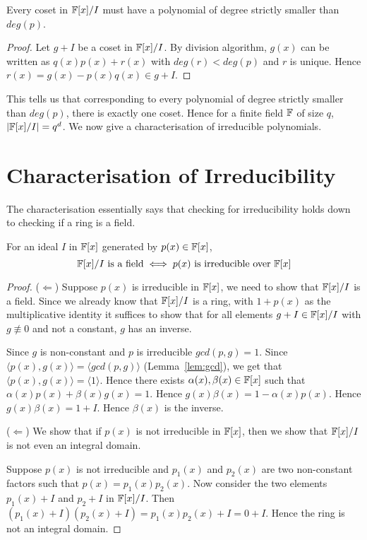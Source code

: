 \begin{observation}
	Every coset in ${\mathbb{F}}[x]/I$ must have a polynomial of degree strictly
	smaller than $deg(p)$.
\end{observation}
\begin{proof}
	Let $g + I$ be a coset in ${\mathbb{F}}[x]/I$. By division algorithm, $g(x)$ can
	be written as $q(x)p(x) + r(x)$ with $deg(r) < deg(p)$ and $r$ is
	unique. Hence $r(x) = g(x) - p(x)q(x) \in g +I$.
\end{proof}

This tells us that corresponding to every polynomial of degree strictly
smaller than $deg(p)$, there is exactly one coset. Hence for a finite field
${\mathbb{F}}$ of size $q$, $|{\mathbb{F}}[x]/I| = q^d$.  We now give a characterisation of
irreducible polynomials.  
\section{Characterisation of Irreducibility}
The characterisation essentially says that checking for irreducibility holds
down to checking if a ring is a field.
\begin{theorem}
	For an ideal $I$ in ${\mathbb{F}}[x]$ generated by $p(x) \in {\mathbb{F}}[x]$, 
	\[ {\mathbb{F}}[x]/I \text{ is a field} \iff p(x) \text{ is irreducible over }
	{\mathbb{F}}[x] \]
\end{theorem}
\begin{proof}
	($\Longleftarrow$) Suppose $p(x)$ is irreducible in ${\mathbb{F}}[x]$, we need
	to show that ${\mathbb{F}}[x]/I$ is a field. Since we already know that
	${\mathbb{F}}[x]/I$ is a ring, with $1+p(x)$ as the multiplicative identity it
	suffices to show that for all elements $g + I \in {\mathbb{F}}[x]/I$ with $g
	\not \equiv 0$ and not a constant, $g$ has an inverse. 

	Since $g$ is non-constant and $p$ is irreducible $gcd(p,g) = 1$. Since
	$\langle p(x), g(x) \rangle = \langle gcd(p,g) \rangle$
	(Lemma~\ref{lem:gcd}), we get that $\langle p(x) ,g(x) \rangle =
	\langle 1 \rangle$. Hence there exists $\alpha(x), \beta(x) \in {\mathbb{F}}[x]$
	such that $\alpha(x)p(x) + \beta(x)g(x) = 1$. Hence $g(x)\beta(x) = 1
	- \alpha(x)p(x)$. Hence $g(x) \beta(x) = 1 + I$. Hence $\beta(x)$ is
	the inverse.

	($\Longleftarrow$) We show that if $p(x)$ is not irreducible in
	${\mathbb{F}}[x]$, then we show that ${\mathbb{F}}[x]/I$ is not even an integral domain. 

	Suppose $p(x)$ is not irreducible and $p_1(x)$ and $p_2(x)$ are two
	non-constant factors such that $p(x) = p_1(x)p_2(x)$. Now
	consider the two elements $p_1(x) + I$ and $p_2 + I$ in ${\mathbb{F}}[x]/I$.
	Then $(p_1(x) + I) (p_2(x) + I) = p_1(x)p_2(x) + I = 0 + I$. Hence the
	ring is not an integral domain.
\end{proof}



